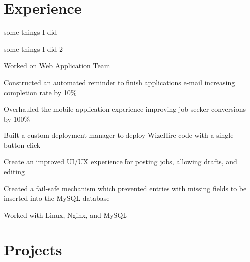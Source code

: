 \documentclass[]{deedy-resume-openfont}
\begin{document}
\begin{minipage}[t]{0.66\textwidth} 


\section{Experience}

\begin{tightemize}
\item some things I did
\end{tightemize}
\sectionsep

\begin{tightemize}
\item some things I did 2
\end{tightemize}
\sectionsep

\vspace{\topsep} %
\begin{tightemize}
\item Worked on Web Application Team
\item Constructed an automated reminder to finish applications e-mail increasing completion rate by 10\%
\item Overhauled the mobile application experience improving job seeker conversions by 100\%
\item Built a custom deployment manager to deploy WizeHire code with a single button click
\item Create an improved UI/UX experience for posting jobs, allowing drafts, and editing
\item Created a fail-safe mechanism which prevented entries with missing fields to be inserted into the MySQL database
\item Worked with Linux, Nginx, and MySQL
\end{tightemize}
\sectionsep


\section{Projects}


\end{minipage}
\end{document}
